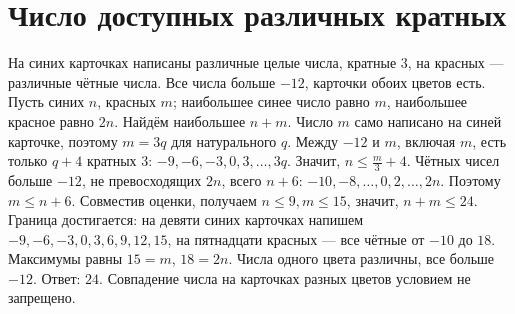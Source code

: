 \section{Число доступных различных кратных}
\begin{example}\label{ex:review-ege-c17-3}
На синих карточках написаны различные целые числа, кратные \(3\), на красных — различные чётные числа. Все числа больше \(-12\), карточки обоих цветов есть. Пусть синих \(n\), красных \(m\); наибольшее синее число равно \(m\), наибольшее красное равно \(2n\). Найдём наибольшее \(n+m\).
Число \(m\) само написано на синей карточке, поэтому \(m=3q\) для натурального \(q\). Между \(-12\) и \(m\), включая \(m\), есть только \(q+4\) кратных \(3\): \(-9,-6,-3,0,3,\ldots,3q\). Значит, \(n\le\frac m3+4\). Чётных чисел больше \(-12\), не превосходящих \(2n\), всего \(n+6\): \(-10,-8,\ldots,0,2,\ldots,2n\). Поэтому \(m\le n+6\). Совместив оценки, получаем \(n\le9,m\le15\), значит, \(n+m\le24\).
Граница достигается: на девяти синих карточках напишем \(-9,-6,-3,0,3,6,9,12,15\), на пятнадцати красных — все чётные от \(-10\) до \(18\). Максимумы равны \(15=m\), \(18=2n\). Числа одного цвета различны, все больше \(-12\). Ответ: \(24\). Совпадение числа на карточках разных цветов условием не запрещено.
\end{example}

